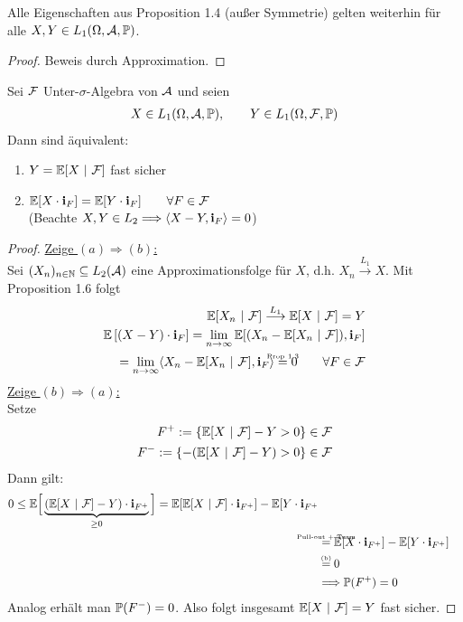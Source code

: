 \begin{korollar} %
Alle Eigenschaften aus Proposition 1.4 (außer Symmetrie) gelten weiterhin für alle $X,Y\in L_1(\Omega,\A,\P)$.
\end{korollar}
\begin{proof}
Beweis durch Approximation.
\end{proof}

\begin{theorem}%
Sei $\F$ Unter-$\sigma$-Algebra von $\A$ und seien
\begin{align*}
X\in L_1(\Omega,\A,\P),\qquad Y\in L_1(\Omega,\F,\P)
\end{align*}
Dann sind äquivalent:
\begin{enumerate}
\item $Y=\E[X~|~\F]$ fast sicher
\item $\E[X\cdot\indi_F]=\E[Y\cdot\indi_F]\qquad\forall F\in\F$\\
(Beachte $X,Y\in L_2\Longrightarrow\langle X-Y,\indi_F\rangle=0$)
\end{enumerate}
\end{theorem}
\begin{proof}
\underline{Zeige $(a)\Longrightarrow (b)$:}\\
Sei $(X_n)_{n\in\N}\subseteq L_2(\A)$ eine Approximationsfolge für $X$, d.h. $X_n\stackrel{L_1}{\longrightarrow} X$. Mit Proposition 1.6 folgt
\begin{align*}
\E[X_n~|~\F]\stackrel{L_1}{\longrightarrow}\E[X~|~\F]=Y\\
\E\left[(X-Y)\cdot\indi_F\right]
=
\limn\E[(X_n-\E[X_n~|~\F]),\indi_F]\\
=
\limn\langle X_n-\E[X_n~|~\F],\indi_F\rangle
\stackeq{Prop 1.3}
0\qquad\forall F\in\F
\end{align*}
\underline{Zeige $(b)\Longrightarrow (a)$:}\\
Setze 
\begin{align*}
F^{+}:=\left\lbrace\E[X~|~\F]-Y>0\right\rbrace\in\F\\
F^{-}:=\left\lbrace-(\E[X~|~\F]-Y)>0\right\rbrace\in\F
\end{align*}
Dann gilt:
\begin{align*}
0
\leq
\E\Big[\underbrace{(\E[X~|~\F]-Y)\cdot\indi_{F^+}}_{\geq0}\Big]
=
\E[\E[X~|~\F]\cdot\indi_{F^+}]-\E[Y\cdot\indi_{F^+}\\
&\stackeq{Pull-out + Turm}
\E[X\cdot\indi_{F^+}]-\E[Y\cdot\indi_{F^+}]\\
&\stackeq{(b)}
0\\
&\Longrightarrow\P(F^+)=0
\end{align*}
Analog erhält man $\P(F^-)=0$. Also folgt insgesamt $\E[X~|~\F]=Y$ fast sicher.
\end{proof}


